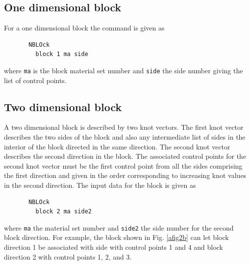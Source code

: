 \subsection{One dimensional block}

For a one dimensional block the command is given as
\begin{verbatim}
       NBLOck
         block 1 ma side
\end{verbatim}
where \texttt{ma} is the block material set number
and \texttt{side} the side number giving the list of control points.

\subsection{Two dimensional block}

A two dimensional block is described by two knot vectors.  The first knot
vector describes the two sides of the block and also any intermediate list
of sides in the interior of the block directed in the same direction.  The
second knot vector describes the second direction in the block.  The associated
control points for the second knot vector must be the first control point
from all the sides comprising the first direction and given in the order
corresponding to increasing knot values in the second direction.  The
input data for the block is given as
\setlength{\baselineskip}{12pt}
\begin{verbatim}
       NBLOck
         block 2 ma side2
\end{verbatim}
\setlength{\baselineskip}{14pt}
where \texttt{ma} the material set number and
\texttt{side2} the side number for the second block direction.
For example, the block shown in Fig. \ref{afig2b} can let block direction 1
be associated with side with control points 1 and 4 and block direction 2 with
control points 1, 2, and 3.

